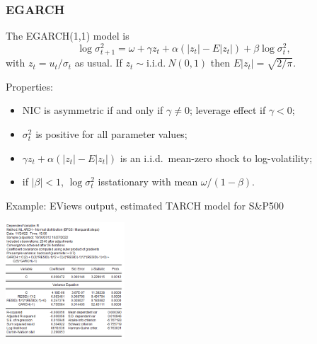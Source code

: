 \begin{frame}%

\frametitle{EGARCH}

The EGARCH(1,1) model is%
\begin{equation*}
\log \sigma _{t+1}^{2}=\omega +\gamma z_{t}+\alpha (\left\vert
z_{t}\right\vert -E\left\vert z_{t}\right\vert )+\beta \log \sigma _{t}^{2},
\end{equation*}%
with $z_{t}=u_{t}/\sigma _{t}$ as usual. If $z_{t}\sim \text{i.i.d.}~N(0,1) $
then $E\left\vert z_{t}\right\vert =\sqrt{2/\pi }$.

Properties:

\begin{itemize}
\item NIC is asymmetric if and only if $\gamma \neq 0$; leverage effect if $%
\gamma <0$;

\item $\sigma _{t}^{2}$ is positive for all parameter values;

\item $\gamma z_{t}+\alpha (\left\vert z_{t}\right\vert -E\left\vert
z_{t}\right\vert )$ is an i.i.d.~mean-zero shock to log-volatility;

\item if $\left\vert \beta \right\vert <1$, $\log \sigma _{t}^{2}$
is\thinspace stationary with mean $\omega /(1-\beta )$.
\end{itemize}

\end{frame}%


\begin{frame}%

\begin{block}{Example: EViews output, estimated TARCH model for S\&P500}
\centerline{\includegraphics[height=1.7in]{sp500_gjr}}
\end{block}

\end{frame}%

